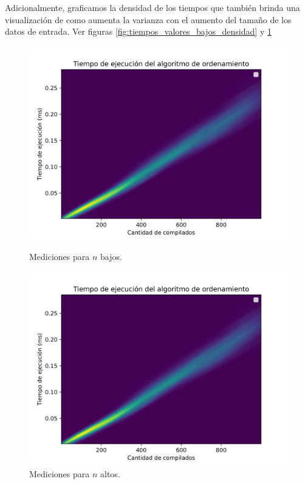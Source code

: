 Adicionalmente, graficamos la densidad de los tiempos que también brinda una visualización de como aumenta la varianza con el aumento del tamaño
de los datos de entrada. Ver figuras \ref{fig:tiempos_valores_bajos_densidad} y \ref{fig:tiempos_valores_altos_densidad} 

\begin{figure}[ht]
    \centering
    \begin{minipage}[b]{0.495\textwidth}
        \centering
        \includegraphics[width=\textwidth]{img/tiempos_valores_bajos_densidad.png}
        \caption{Mediciones para $n$ bajos.}
        \label{fig:tiempos_valores_bajos_densidad}
    \end{minipage}
    \begin{minipage}[b]{0.495\textwidth}
        \centering
        \includegraphics[width=\textwidth]{img/tiempos_valores_altos_densidad.png}
        \caption{Mediciones para $n$ altos.}
        \label{fig:tiempos_valores_altos_densidad}
    \end{minipage}
\end{figure}